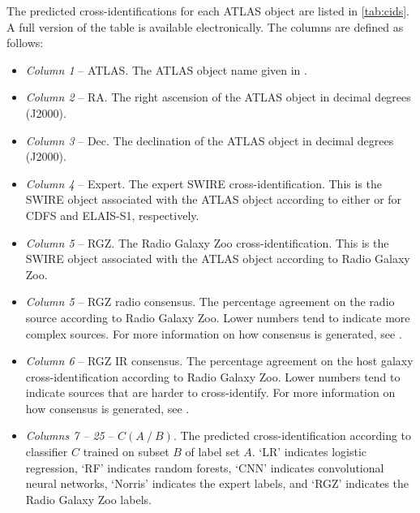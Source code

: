 \documentclass[fleqn,usenatbib,usedcolumn]{mnras}
\begin{document}
  The predicted cross-identifications for each ATLAS object are listed in
  \autoref{tab:cids}. A full version of the table is available electronically.
  The columns are defined as follows:
  \begin{itemize}
    \item {\em Column 1}  -- ATLAS. The ATLAS object name given in \citet{franzen15}.
    \item {\em Column 2} -- RA. The right ascension of the ATLAS object in decimal degrees (J2000).
    \item {\em Column 3} -- Dec. The declination of the ATLAS object in decimal degrees (J2000).
    \item {\em Column 4} -- Expert. The expert SWIRE cross-identification.
      This is the SWIRE object associated with the ATLAS object according to
      either \citet{norris06} or \citet{middelberg08} for CDFS and ELAIS-S1,
      respectively.
    \item {\em Column 5} -- RGZ. The Radio Galaxy Zoo cross-identification.
      This is the SWIRE object associated with the ATLAS object according to
      Radio Galaxy Zoo.
    \item {\em Column 5} -- RGZ radio consensus. The percentage agreement on
      the radio source according to Radio Galaxy Zoo. Lower numbers tend to
      indicate more complex sources. For more information on how consensus is
      generated, see \citet{wong17}.
    \item {\em Column 6} -- RGZ IR consensus. The percentage agreement on
      the host galaxy cross-identification according to Radio Galaxy Zoo.
      Lower numbers tend to indicate sources that are harder to
      cross-identify. For more information on how consensus is generated, see
      \citet{wong17}.
    \item {\em Columns 7 -- 25} -- $C(A\ /\ B)$. The predicted
      cross-identification according to classifier $C$ trained on subset $B$
      of label set $A$. `LR' indicates logistic regression, `RF' indicates
      random forests, `CNN' indicates convolutional neural networks, `Norris'
      indicates the expert labels, and `RGZ' indicates the Radio Galaxy Zoo
      labels.
  \end{itemize}
  
\bsp	%
\label{lastpage}
\end{document}
